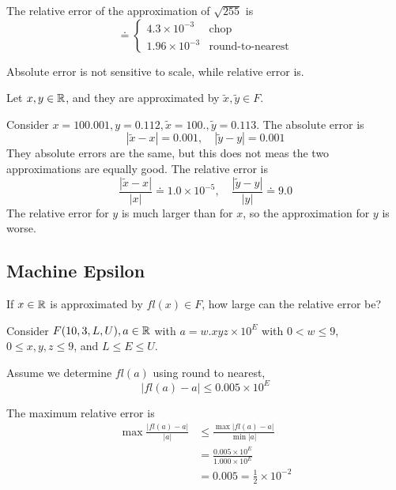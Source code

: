 \begin{example}
    The relative error of the approximation of \( \sqrt{255} \) is \[
        \doteq \begin{cases}
            4.3 \times 10^{-3}  & \text{chop}             \\
            1.96 \times 10^{-3} & \text{round-to-nearest}
        \end{cases}
    \]
\end{example}

\begin{remark}
    Absolute error is not sensitive to scale, while relative error is.
\end{remark}

\begin{example}
    Let \( x, y \in \mathbb{R} \), and they are approximated by \( \tilde{x}, \tilde{y} \in F \).

    Consider \( x = 100.001, y = 0.112, \tilde{x} = 100., \tilde{y} = 0.113 \). The absolute error is \[
        | \tilde{x} - x | = 0.001, \quad | \tilde{y} - y | = 0.001
    \]
    They absolute errors are the same, but this does not meas the two approximations are equally good. The relative error is \[
        \frac{| \tilde{x} - x |}{|x|} \doteq 1.0 \times 10^{-5}, \quad \frac{| \tilde{y} - y |}{|y|} \doteq 9.0
    \] The relative error for \( y \) is much larger than for \( x \), so the approximation for \( y \) is worse.
\end{example}

\subsection{Machine Epsilon}

If \( x \in \mathbb{R} \) is approximated by \( fl(x) \in F \), how large can the relative error be?

\begin{example}
    Consider \( F(10, 3, L, U ), a \in \mathbb{R} \) with \( a = w.xyz \times 10^E \) with \( 0 < w \leq 9 \),  \( 0 \leq x, y, z \leq 9 \), and \( L \leq E \leq U \).

    Assume we determine \( fl(a) \) using round to nearest, \[
        | fl(a) - a | \leq 0.005 \times 10^E
    \]

    The maximum relative error is \begin{align*}
        \max \frac{| fl(a) - a |}{|a|}
         & \leq \frac{\max | fl(a) - a |}{\min | a |}    \\
         & = \frac{0.005 \times 10^E}{1.000 \times 10^E} \\
         & = 0.005 = \frac{1}{2} \times 10^{-2}
    \end{align*}
\end{example}

